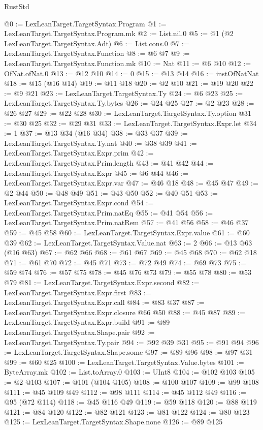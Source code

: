 \begin{lexlean}{RustStd}
\begin{coremodule}
@0 := LexLeanTarget.TargetSyntax.Program
@1 := LexLeanTarget.TargetSyntax.Program.mk
@2 := List.nil.{0}
@5 := @1 (@2 LexLeanTarget.TargetSyntax.Adt)
@6 := List.cons.{0}
@7 := LexLeanTarget.TargetSyntax.Function
@8 := @6 @7
@9 := LexLeanTarget.TargetSyntax.Function.mk
@10 := Nat
@11 := @6 @10
@12 := OfNat.ofNat.{0}
@13 := @12 @10
@14 := 0
@15 := @13 @14
@16 := instOfNatNat
@18 := @15 (@16 @14)
@19 := @11 @18
@20 := @2 @10
@21 := @19 @20
@22 := @9 @21
@23 := LexLeanTarget.TargetSyntax.Ty
@24 := @6 @23
@25 := LexLeanTarget.TargetSyntax.Ty.bytes
@26 := @24 @25
@27 := @2 @23
@28 := @26 @27
@29 := @22 @28
@30 := LexLeanTarget.TargetSyntax.Ty.option
@31 := @30 @25
@32 := @29 @31
@33 := LexLeanTarget.TargetSyntax.Expr.let
@34 := 1
@37 := @13 @34 (@16 @34)
@38 := @33 @37
@39 := LexLeanTarget.TargetSyntax.Ty.nat
@40 := @38 @39
@41 := LexLeanTarget.TargetSyntax.Expr.prim
@42 := LexLeanTarget.TargetSyntax.Prim.length
@43 := @41 @42
@44 := LexLeanTarget.TargetSyntax.Expr
@45 := @6 @44
@46 := LexLeanTarget.TargetSyntax.Expr.var
@47 := @46 @18
@48 := @45 @47
@49 := @2 @44
@50 := @48 @49
@51 := @43 @50
@52 := @40 @51
@53 := LexLeanTarget.TargetSyntax.Expr.cond
@54 := LexLeanTarget.TargetSyntax.Prim.natEq
@55 := @41 @54
@56 := LexLeanTarget.TargetSyntax.Prim.natRem
@57 := @41 @56
@58 := @46 @37
@59 := @45 @58
@60 := LexLeanTarget.TargetSyntax.Expr.value
@61 := @60 @39
@62 := LexLeanTarget.TargetSyntax.Value.nat
@63 := 2
@66 := @13 @63 (@16 @63)
@67 := @62 @66
@68 := @61 @67
@69 := @45 @68
@70 := @62 @18
@71 := @61 @70
@72 := @45 @71
@73 := @72 @49
@74 := @69 @73
@75 := @59 @74
@76 := @57 @75
@78 := @45 @76 @73
@79 := @55 @78
@80 := @53 @79
@81 := LexLeanTarget.TargetSyntax.Expr.second
@82 := LexLeanTarget.TargetSyntax.Expr.first
@83 := LexLeanTarget.TargetSyntax.Expr.call
@84 := @83 @37
@87 := LexLeanTarget.TargetSyntax.Expr.closure @66 @50
@88 := @45 @87
@89 := LexLeanTarget.TargetSyntax.Expr.build
@91 := @89 LexLeanTarget.TargetSyntax.Shape.pair
@92 := LexLeanTarget.TargetSyntax.Ty.pair
@94 := @92 @39 @31
@95 := @91 @94
@96 := LexLeanTarget.TargetSyntax.Shape.some
@97 := @89 @96
@98 := @97 @31
@99 := @60 @25
@100 := LexLeanTarget.TargetSyntax.Value.bytes
@101 := ByteArray.mk
@102 := List.toArray.{0}
@103 := UInt8
@104 := @102 @103
@105 := @2 @103
@107 := @101 (@104 @105)
@108 := @100 @107
@109 := @99 @108
@111 := @45 @109 @49
@112 := @98 @111
@114 := @45 @112 @49
@116 := @95 (@72 @114)
@118 := @45 @116 @49
@119 := @59 @118
@120 := @88 @119
@121 := @84 @120
@122 := @82 @121
@123 := @81 @122
@124 := @80 @123
@125 := LexLeanTarget.TargetSyntax.Shape.none
@126 := @89 @125

\end{coremodule}
\end{lexlean}
